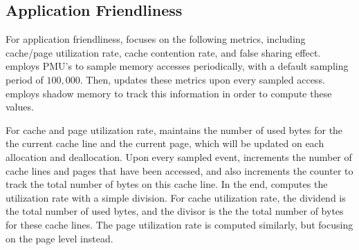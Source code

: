 \subsection{Application Friendliness}
\label{sec:profilefriendliness}

 
For application friendliness, \MP{} focuses on the following metrics, including cache/page utilization rate, cache contention rate, and false sharing effect. \MP{} employs PMU's to sample memory accesses periodically, with a default sampling period of $100,000$. Then, \MP{} updates these metrics upon every sampled access. \MP{} employs shadow memory to track this information in order to compute these values. 

For cache and page utilization rate, \MP{} maintains the number of used bytes for the  the current cache line and the current page, which will be updated on each allocation and deallocation. Upon every sampled event, \MP{} increments the number of cache lines and pages that have been accessed, and also increments the counter to track the total number of bytes on this cache line. In the end, \MP{} computes the utilization rate with a simple division. For cache utilization rate, the dividend is the total number of used bytes, and the divisor is the the total number of bytes for these cache lines. The page utilization rate is computed similarly, but focusing on the page level instead. 

